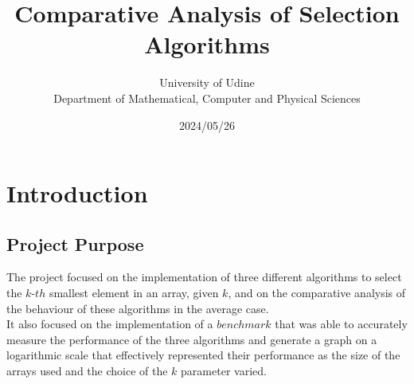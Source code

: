 \documentclass{article}
\title{Comparative Analysis of Selection Algorithms}
\author{University of Udine\\Department of Mathematical, Computer and Physical Sciences}
\date{2024/05/26}
\begin{document}
\maketitle

\tableofcontents
\newpage

\section{Introduction}

\subsection{Project Purpose}
The project focused on the implementation of three different algorithms to select the $k$-$th$ smallest element in an array, given $k$, and on the comparative analysis of the behaviour of these algorithms in the average case.\\
It also focused on the implementation of a $benchmark$ that was able to accurately measure the performance of the three algorithms and generate a graph on a logarithmic scale that effectively represented their performance as the size of the arrays used and the choice of the $k$ parameter varied.
\end{document}
